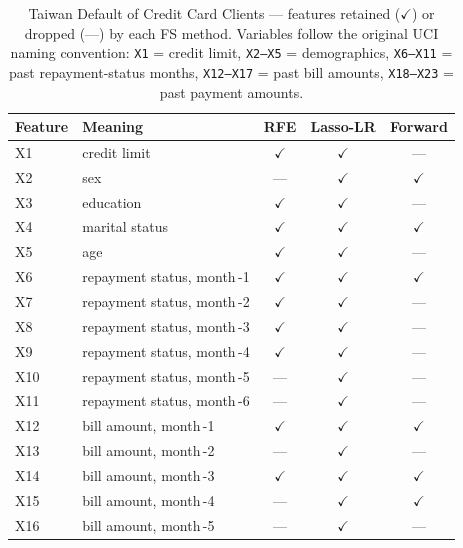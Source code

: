 \begin{table}[H]
\centering
\caption{Taiwan Default of Credit Card Clients --- features retained
($\checkmark$) or dropped (---) by each FS method.  Variables follow
the original UCI naming convention: \texttt{X1} = credit limit,
\texttt{X2--X5} = demographics, \texttt{X6--X11} = past
repayment-status months, \texttt{X12--X17} = past bill amounts,
\texttt{X18--X23} = past payment amounts.}
\singlespacing
\label{tab:fs-tai}
\small
\begin{tabular}{l l c c c}
\toprule
\textbf{Feature} & \textbf{Meaning} & \textbf{RFE} & \textbf{Lasso-LR} & \textbf{Forward}\\
\midrule
X1   & credit limit                         & $\checkmark$ & $\checkmark$ & ---\\
X2   & sex                                  & ---          & $\checkmark$ & $\checkmark$\\
X3   & education                            & $\checkmark$ & $\checkmark$ & ---\\
X4   & marital status                       & $\checkmark$ & $\checkmark$ & $\checkmark$\\
X5   & age                                  & $\checkmark$ & $\checkmark$ & ---\\
X6   & repayment status, month\,-1          & $\checkmark$ & $\checkmark$ & $\checkmark$\\
X7   & repayment status, month\,-2          & $\checkmark$ & $\checkmark$ & ---\\
X8   & repayment status, month\,-3          & $\checkmark$ & $\checkmark$ & ---\\
X9   & repayment status, month\,-4          & $\checkmark$ & $\checkmark$ & ---\\
X10  & repayment status, month\,-5          & ---          & $\checkmark$ & ---\\
X11  & repayment status, month\,-6          & ---          & $\checkmark$ & ---\\
X12  & bill amount, month\,-1               & $\checkmark$ & $\checkmark$ & $\checkmark$\\
X13  & bill amount, month\,-2               & ---          & $\checkmark$ & ---\\
X14  & bill amount, month\,-3               & $\checkmark$ & $\checkmark$ & $\checkmark$\\
X15  & bill amount, month\,-4               & ---          & $\checkmark$ & $\checkmark$\\
X16  & bill amount, month\,-5               & ---          & $\checkmark$ & ---\\

\end{tabular}
\end{table}

